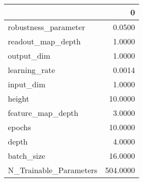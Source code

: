 \begin{tabular}{lr}
\toprule
{} &         0 \\
\midrule
robustness\_parameter   &    0.0500 \\
readout\_map\_depth      &    1.0000 \\
output\_dim             &    1.0000 \\
learning\_rate          &    0.0014 \\
input\_dim              &    1.0000 \\
height                 &   10.0000 \\
feature\_map\_depth      &    3.0000 \\
epochs                 &   10.0000 \\
depth                  &    4.0000 \\
batch\_size             &   16.0000 \\
N\_Trainable\_Parameters &  504.0000 \\
\bottomrule
\end{tabular}
